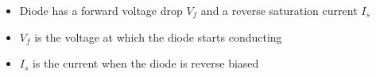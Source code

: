 \begin{definition}
    \begin{itemize}
        \item Diode has a forward voltage drop $V_f$ and a reverse saturation current $I_s$
        \item $V_f$ is the voltage at which the diode starts conducting
        \item $I_s$ is the current when the diode is reverse biased
    \end{itemize}
\end{definition}